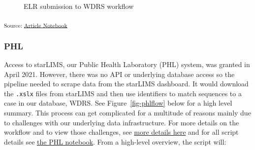 \documentclass[
]{agujournal2019}
\begin{document}
\begin{figure}


\caption{\label{fig-elrflow}ELR submission to WDRS workflow}

\end{figure}%

\textsubscript{Source:
\href{https://NW-PaGe.github.io/sequencing_integration_pipeline1.0/index.qmd.html}{Article
Notebook}}

\subsubsection{PHL}\label{sec-phl}

Access to starLIMS, our Public Health Laboratory (PHL) system, was
granted in April 2021. However, there was no API or underlying database
access so the pipeline needed to scrape data from the starLIMS
dashboard. It would download the \texttt{.xslx} files from starLIMS and
then use identifiers to match sequences to a case in our database, WDRS.
See Figure~\ref{fig-phlflow} below for a high level summary. This
process can get complicated for a multitude of reasons mainly due to
challenges with our underlying data infrastructure. For more details on
the workflow and to view those challenges, see
\href{notebooks/phl.Rmd\#fig-phlworkflow}{more details here} and for all
script details see \href{notebooks/phl.Rmd}{the PHL notebook}. From a
high-level overview, the script will:
\end{document}
